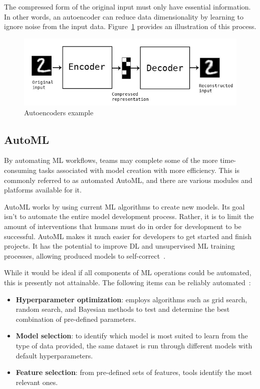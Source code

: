 The compressed form of the original input must only have essential information. In other words, an autoencoder can reduce data dimensionality by learning to ignore noise from the input data. Figure~\ref{fig:ac_example} provides an illustration of this process.

\begin{figure}[htbp]
    \centering
    \includegraphics[width=0.7\linewidth]{Chapters/Figures/ac_example.jpeg}
    \caption{Autoencoders example~\cite{Badr2019Auto-Encoder:For}}
    \label{fig:ac_example}
\end{figure}

\subsection{AutoML}

By automating \gls{ML} workflows, teams may complete some of the more time-consuming tasks associated with model creation with more efficiency. This is commonly referred to as automated \gls{AutoML}, and there are various modules and platforms available for it.

\gls{AutoML} works by using current \gls{ML} algorithms to create new models. Its goal isn't to automate the entire model development process. Rather, it is to limit the amount of interventions that humans must do in order for development to be successful. \gls{AutoML} makes it much easier for developers to get started and finish projects. It has the potential to improve \gls{DL} and unsupervised \gls{ML} training processes, allowing produced models to self-correct~\cite{MachineRun:AI}.

While it would be ideal if all components of \gls{ML} operations could be automated, this is presently not attainable. The following items can be reliably automated~\cite{MachineRun:AI}:

\begin{itemize}
    \item \textbf{Hyperparameter optimization}: employs algorithms such as grid search, random search, and Bayesian methods to test and determine the best combination of pre-defined parameters.
    \item \textbf{Model selection}: to identify which model is most suited to learn from the type of data provided, the same dataset is run through different models with default hyperparameters.
    \item \textbf{Feature selection}: from pre-defined sets of features, tools identify the most relevant ones.
\end{itemize}

